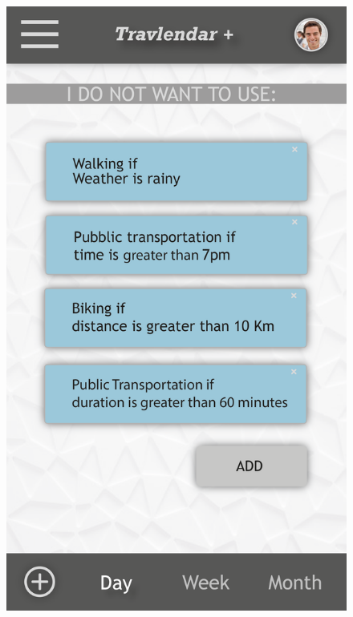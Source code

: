 \begin{figure}[!h]
	\centering
	\begin{minipage}{.275\textwidth}
		\centering
		\includegraphics[width=\linewidth]{Images/Mockups/MockupConstraintsApp1.png}
	\end{minipage}%
	\hspace*{1cm}
	\begin{minipage}{.275\textwidth}
		\centering

\end{minipage}
\end{figure}
